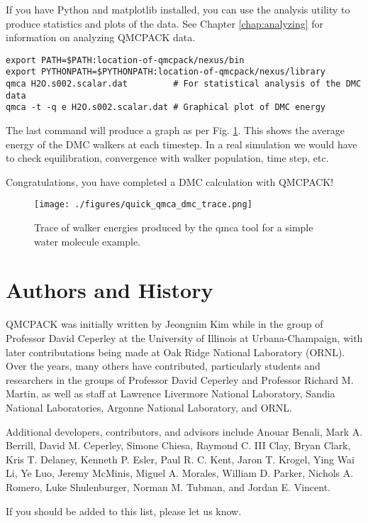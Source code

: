 If you have Python and matplotlib installed, you can use the
 analysis utility to produce statistics and plots of the
data. See Chapter \ref{chap:analyzing} for information on analyzing
QMCPACK data.
\begin{verbatim}
export PATH=$PATH:location-of-qmcpack/nexus/bin 
export PYTHONPATH=$PYTHONPATH:location-of-qmcpack/nexus/library
qmca H2O.s002.scalar.dat         # For statistical analysis of the DMC data
qmca -t -q e H2O.s002.scalar.dat # Graphical plot of DMC energy
\end{verbatim}

The last command will produce a graph as per
Fig. \ref{fig:quick_qmca_dmc_trace}. This shows the average energy of
the DMC walkers at each timestep. In a real simulation we would have
to check equilibration, convergence with walker population, time step, etc.

Congratulations, you have completed a DMC calculation with QMCPACK!

\begin{figure}
  \centering
  \texttt{[image: ./figures/quick\_qmca\_dmc\_trace.png]}
  \caption{Trace of walker energies produced by the qmca tool for a simple
    water molecule example.}
  \label{fig:quick_qmca_dmc_trace}
\end{figure}

\section{Authors and History}
\label{sec:history}
QMCPACK was initially written by Jeongnim Kim while in the group of
Professor David Ceperley at the University of Illinois at
Urbana-Champaign, with later contributations being made at Oak Ridge National Laboratory (ORNL). Over the years, many others have contributed, particularly
students and researchers in the groups of Professor David Ceperley
and Professor Richard M. Martin, as well as staff at Lawrence Livermore
National Laboratory, Sandia National Laboratories, Argonne National
Laboratory, and ORNL.

Additional developers, contributors, and advisors include
Anouar Benali,
Mark A. Berrill,  
David M. Ceperley, 
Simone Chiesa,
Raymond C. III Clay,
Bryan Clark,
Kris T. Delaney,
Kenneth P. Esler,
Paul R. C. Kent,
Jaron T. Krogel,
Ying Wai Li,
Ye Luo,
Jeremy McMinis,
Miguel A. Morales,
William D. Parker,
Nichols A. Romero,
Luke Shulenburger,
Norman M. Tubman,
and Jordan E. Vincent.

If you should be added to this list, please let us know.

